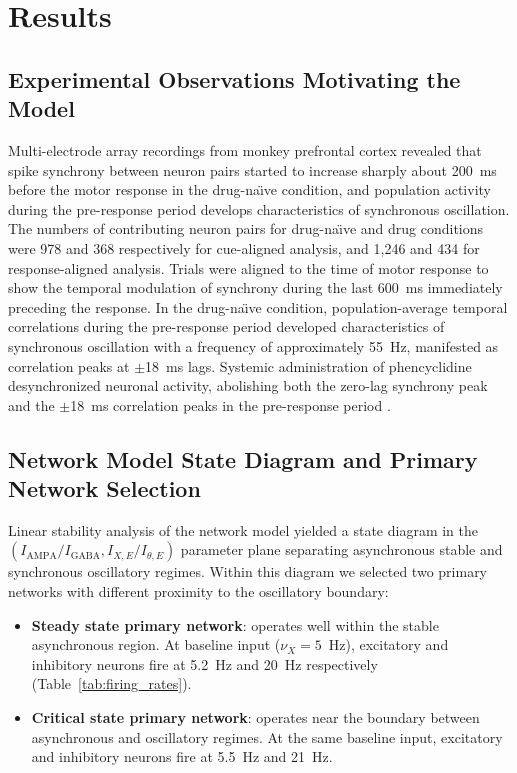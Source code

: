 \documentclass[10pt]{article}
\begin{document}
\section{Results}

\subsection{Experimental Observations Motivating the Model}

Multi-electrode array recordings from monkey prefrontal cortex revealed that
spike synchrony between neuron pairs started to increase sharply about
200~ms before the motor response in the drug-na\"{\i}ve condition, and
population activity during the pre-response period develops characteristics
of synchronous oscillation. The numbers of contributing neuron pairs for
drug-na\"{\i}ve and drug conditions were 978 and 368 respectively for
cue-aligned analysis, and 1{,}246 and 434 for response-aligned analysis.
Trials were aligned to the time of motor response to show the temporal
modulation of synchrony during the last 600~ms immediately preceding the
response. In the drug-na\"{\i}ve condition, population-average
temporal correlations during the pre-response period developed characteristics
of synchronous oscillation with a frequency of approximately 55~Hz, manifested
as correlation peaks at $\pm$18~ms lags. Systemic administration of
phencyclidine desynchronized neuronal activity, abolishing both the zero-lag
synchrony peak and the $\pm$18~ms correlation peaks in the pre-response
period \citep{zick2018blocking}.

\subsection{Network Model State Diagram and Primary Network Selection}

Linear stability analysis of the network model yielded a state diagram in the
$(I_{\text{AMPA}}/I_{\text{GABA}}, I_{X,E}/I_{\theta,E})$ parameter plane
separating asynchronous stable and synchronous oscillatory regimes. Within
this diagram we selected two primary networks with different proximity to
the oscillatory boundary:

\begin{itemize}
  \item \textbf{Steady state primary network}: operates well within the
    stable asynchronous region. At baseline input ($\nu_X = 5$~Hz),
    excitatory and inhibitory neurons fire at 5.2~Hz and 20~Hz respectively
    (Table~\ref{tab:firing_rates}).
  \item \textbf{Critical state primary network}: operates near the
    boundary between asynchronous and oscillatory regimes. At the same
    baseline input, excitatory and inhibitory neurons fire at 5.5~Hz and
    21~Hz.
\end{itemize}
\end{document}
